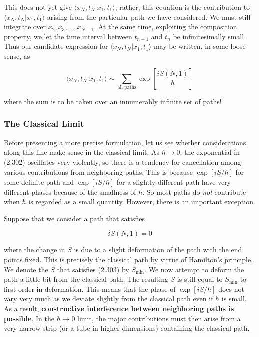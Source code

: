 \documentclass[11pt,a4paper]{article}
\begin{document}
This does not yet give $\langle x_N, t_N|x_1, t_1\rangle$; rather, this equation is the contribution to $\langle x_N, t_N|x_1, t_1\rangle$ arising from the particular path we have considered. We must still integrate over $x_2, x_3, \ldots, x_{N-1}$. At the same time, exploiting the composition property, we let the time interval between $t_{n-1}$ and $t_n$ be infinitesimally small. Thus our candidate expression for $\langle x_N, t_N|x_1, t_1\rangle$ may be written, in some loose sense, as

\begin{equation}
\langle x_N, t_N|x_1, t_1\rangle \sim \sum_{\text{all paths}}\exp\left[\frac{iS(N, 1)}{\hbar}\right]
\tag{2.302}
\end{equation}

where the sum is to be taken over an innumerably infinite set of paths!

\subsubsection{The Classical Limit}

Before presenting a more precise formulation, let us see whether considerations along this line make sense in the classical limit. As $\hbar \to 0$, the exponential in (2.302) oscillates very violently, so there is a tendency for cancellation among various contributions from neighboring paths. This is because $\exp[iS/\hbar]$ for some definite path and $\exp[iS/\hbar]$ for a slightly different path have very different phases because of the smallness of $\hbar$. So most paths do \textit{not} contribute when $\hbar$ is regarded as a small quantity. However, there is an important exception.

Suppose that we consider a path that satisfies

\begin{equation}
\delta S(N, 1) = 0
\tag{2.303}
\end{equation}

where the change in $S$ is due to a slight deformation of the path with the end points fixed. This is precisely the classical path by virtue of Hamilton's principle. We denote the $S$ that satisfies (2.303) by $S_{\min}$. We now attempt to deform the path a little bit from the classical path. The resulting $S$ is still equal to $S_{\min}$ to first order in deformation. This means that the phase of $\exp[iS/\hbar]$ does not vary very much as we deviate slightly from the classical path even if $\hbar$ is small. As a result, \textbf{constructive interference between neighboring paths is possible}. In the $\hbar \to 0$ limit, the major contributions must then arise from a very narrow strip (or a tube in higher dimensions) containing the classical path.
\end{document}
